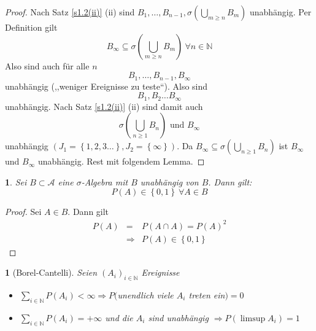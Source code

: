 \documentclass[10pt,a4paper]{report}
\numberwithin{equation}{section}
\numberwithin{figure}{section}
\theoremstyle{plain}
\theoremstyle{definition}
\theoremstyle{remark}
\theoremstyle{plain}
\newtheorem{lem}[thm]{\protect\lemmaname}
\providecommand{\lemmaname}{Lemma}
\newcommand{\1}{ \mathbb{1} } %
\begin{document}
\begin{proof}
  Nach Satz \ref{s1.2(ii)} (ii) sind $B_{1},\ldots,B_{n-1},\sigma\left(\bigcup_{m\geq n}B_{m}\right)$
  unabhängig. Per Definition gilt
  \[
  B_{\infty}\subseteq\sigma\left(\bigcup_{m\geq n}B_{m}\right)\ \forall n\in\mathbb{N}
  \]
  Also sind auch für alle $n$
  \[
  B_{1},\ldots,B_{n-1},B_{\infty}
  \]
  unabhängig (,,weniger Ereignisse zu teste``). Also sind
  \[
  B_{1},B_{2}\ldots B_{\infty}
  \]
  unabhängig. Nach Satz \ref{s1.2(ii)} (ii) sind damit auch
  \[
  \sigma\left(\bigcup_{n\geq1}B_{n}\right)\text{ und }B_{\infty}
  \]
  unabhängig $\left(J_{1}=\left\{ 1,2,3\ldots\right\} ,J_{2}=\left\{ \infty\right\} \right)$.
  Da $B_{\infty}\subseteq\sigma\left(\bigcup_{n\geq1}B_{n}\right)$
  ist $B_{\infty}$ und $B_{\infty}$ unabhängig. Rest mit folgendem
  Lemma.
\end{proof}
\begin{lem}  %
  Sei $B\subset\mathcal{A}$ eine $\sigma$-Algebra mit $B$ unabhängig
  von $B$. Dann gilt:
  \[
  P\left(A\right)\in\left\{ 0,1\right\} \ \forall A\in B
  \]
\end{lem}
\begin{proof}
  Sei $A\in B$. Dann gilt
  \begin{eqnarray*}
    P\left(A\right) & = & P\left(A\cap A\right)=P\left(A\right)^{2}\\
    & \Rightarrow & P\left(A\right)\in\left\{ 0,1\right\} 
  \end{eqnarray*}
\end{proof}
\begin{lem}[Borel-Cantelli] 
  Seien $\left(A_{i}\right)_{i\in\mathbb{N}}$ Ereignisse
  \begin{itemize}
  \item [{(i)}] $\sum_{i\in\mathbb{N}}P\left(A_{i}\right)<\infty\Rightarrow$$P($unendlich
    viele $A_{i}$ treten ein$)=0$
  \item [{(ii)}] $\sum_{i\in\mathbb{N}}P\left(A_{i}\right)=+\infty$ und
    die $A_{i}$ sind unabhängig $\Rightarrow P\left(\limsup A_{i}\right)=1$
  \end{itemize}
\end{lem}
\end{document}
